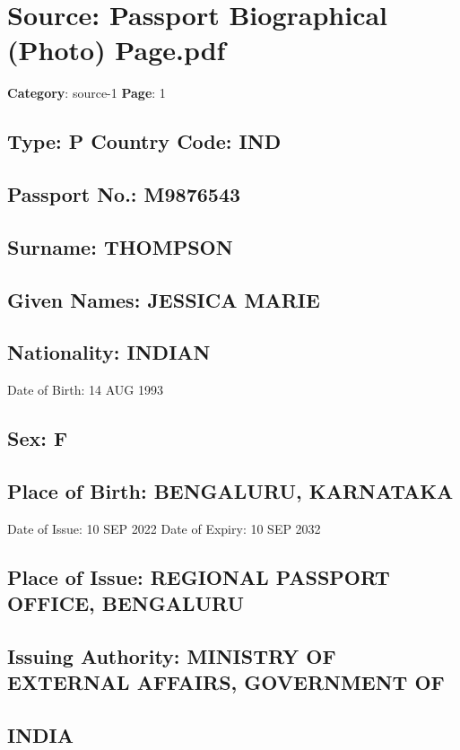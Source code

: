 \section*{Source: Passport Biographical (Photo) Page.pdf}
\textbf{Category}: source-1
\textbf{Page}: 1

\subsection*{Type: P      Country Code: IND}

\subsection*{Passport No.: M9876543}

\subsection*{Surname: THOMPSON}

\subsection*{Given Names: JESSICA MARIE}

\subsection*{Nationality: INDIAN}

Date of Birth: 14 AUG 1993

\subsection*{Sex: F}

\subsection*{Place of Birth: BENGALURU, KARNATAKA}

Date of Issue: 10 SEP 2022 Date of Expiry: 10 SEP 2032

\subsection*{Place of Issue: REGIONAL PASSPORT OFFICE, BENGALURU}

\subsection*{Issuing Authority: MINISTRY OF EXTERNAL AFFAIRS, GOVERNMENT OF}

\subsection*{INDIA}